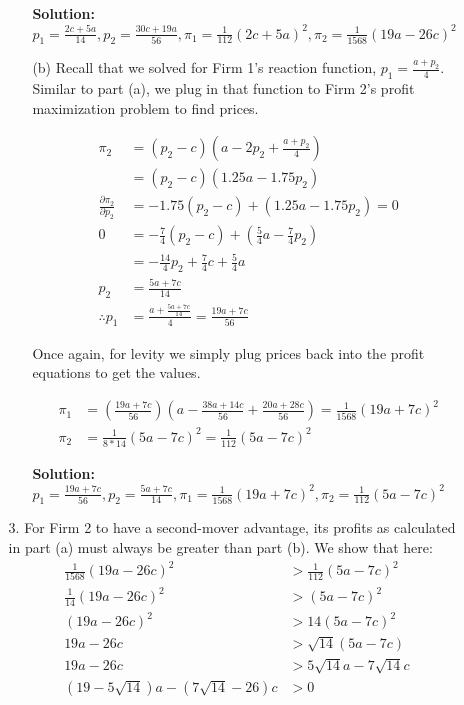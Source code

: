 \documentclass[12pt,letterpaper]{article}
\begin{document}
\begin{enumerate}
\begin{enumerate}
\begin{enumerate}
    {\color{blue}\textbf{Solution:} $p_1 = \frac{2c + 5a}{14}, p_2 = \frac{30c + 19a}{56}, \pi_1 = \frac{1}{112}(2c + 5a)^2, \pi_2 = \frac{1}{1568}(19a - 26c)^2$}

    \item[(b)] Recall that we solved for Firm 1's reaction function, $p_1 = \frac{a + p_2}{4}$. Similar to part (a), we plug in that function to Firm 2's profit maximization problem to find prices.
    
    \begin{align*}
        \pi_2 &= (p_2 - c)(a - 2p_2 + \frac{a + p_2}{4}) \\
        &= (p_2 - c)(1.25a - 1.75p_2) \\
        \frac{\partial \pi_2}{\partial p_2} &= -1.75(p_2 - c) + (1.25a - 1.75p_2) = 0 \\
        0 &= -\frac{7}{4} (p_2 -c) + (\frac{5}{4} a - \frac{7}{4} p_2) \\
        &= -\frac{14}{4} p_2 + \frac{7}{4} c + \frac{5}{4} a \\
        p_2 &= \frac{5a + 7c}{14} \\
        \therefore p_1 &= \frac{a + \frac{5a + 7c}{14}}{4} = \frac{19a + 7c}{56}
    \end{align*}

    Once again, for levity we simply plug prices back into the profit equations to get the values.

    \begin{align*}
        \pi_1 &= (\frac{19a + 7c}{56})(a - \frac{38a + 14c}{56} + \frac{20a + 28c}{56}) = \frac{1}{1568}(19a + 7c)^2 \\
        \pi_2 &= \frac{1}{8*14}(5a-7c)^2 = \frac{1}{112}(5a-7c)^2
    \end{align*}

    {\color{blue}\textbf{Solution:} $p_1 = \frac{19a + 7c}{56}, p_2 = \frac{5a + 7c}{14}, \pi_1 = \frac{1}{1568}(19a + 7c)^2, \pi_2 = \frac{1}{112}(5a-7c)^2$}
\end{enumerate}
    \item[3.] For Firm 2 to have a second-mover advantage, its profits as calculated in part (a) must always be greater than part (b). We show that here:
    \begin{align*}
        \frac{1}{1568}(19a - 26c)^2 &> \frac{1}{112}(5a-7c)^2 \\
        \frac{1}{14}(19a - 26c)^2 &> (5a-7c)^2 \\
        (19a - 26c)^2 &> 14 (5a-7c)^2 \\
        19a - 26c &> \sqrt{14}(5a-7c) \\
        19a - 26c &> 5\sqrt{14}a - 7\sqrt{14}c \\
        (19 - 5\sqrt{14})a - (7\sqrt{14}-26)c &> 0
    \end{align*} 


\end{enumerate}
\end{enumerate}
\end{document}
